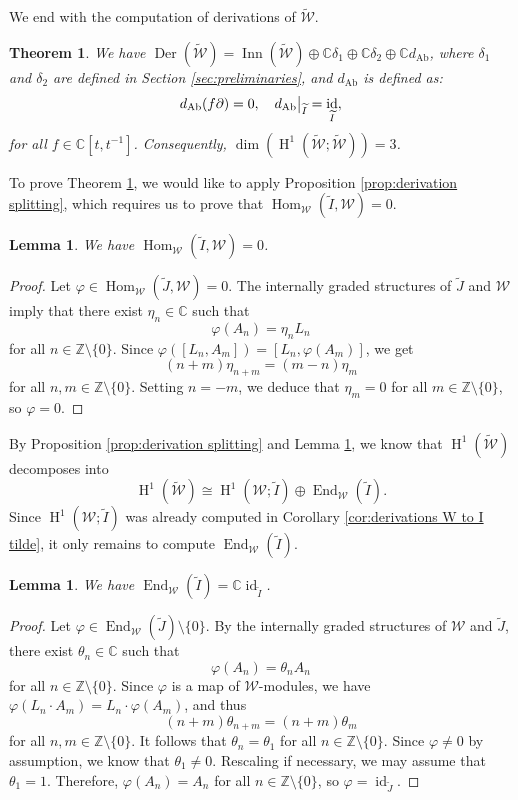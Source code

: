 \documentclass[11pt, svgnames]{amsart}
\DeclareMathOperator{\End}{End}
\DeclareMathOperator{\Hom}{Hom}
\newcommand{\ZZ}{\mathbb{Z}}
\newcommand{\CC}{\mathbb{C}}
\newcommand{\W}{\mathcal{W}}
\DeclareMathOperator{\id}{id}
\DeclareMathOperator{\Der}{Der}
\DeclareMathOperator{\Inn}{Inn}
\newcommand{\del}{\partial}
\DeclareMathOperator{\HH}{H}
\DeclareMathOperator{\Ab}{Ab}
\newcommand{\nonzero}{\setminus \{0\}}
\newcommand\restr[2]{{
  \left.\kern-\nulldelimiterspace %
  #1 %
  \vphantom{\big|}
  \right|_{#2}
  }}
\newtheorem{lemma}[proposition]{Lemma}
\newtheorem{theorem}[proposition]{Theorem}
\theoremstyle{definition}
\begin{document}
We end with the computation of derivations of $\widetilde{\W}$.

\begin{theorem}\label{thm:derivations W tilde}
    We have $\Der(\widetilde{\W}) = \Inn(\widetilde{\W}) \oplus \CC \delta_1 \oplus \CC \delta_2 \oplus \CC d_{\Ab}$, where $\delta_1$ and $\delta_2$ are defined in Section \ref{sec:preliminaries}, and $d_{\Ab}$ is defined as:
    $$d_{\Ab}(f\del) = 0, \quad \restr{d_{\Ab}}{\widetilde{I}} = \id_{\widetilde{I}},$$
    for all $f \in \CC[t,t^{-1}]$. Consequently, $\dim(\HH^1(\widetilde{\W};\widetilde{\W})) = 3$.
\end{theorem}

To prove Theorem \ref{thm:derivations W tilde}, we would like to apply Proposition \ref{prop:derivation splitting}, which requires us to prove that $\Hom_\W(\widetilde{I},\W) = 0$.

\begin{lemma}\label{lem:no homs I tilde to W}
    We have $\Hom_\W(\widetilde{I},\W) = 0$.
\end{lemma}
\begin{proof}
    Let $\varphi \in \Hom_\W(\widetilde{J},\W) = 0$. The internally graded structures of $\widetilde{J}$ and $\W$ imply that there exist $\eta_n \in \CC$ such that
    $$\varphi(A_n) = \eta_n L_n$$
    for all $n \in \ZZ \nonzero$. Since $\varphi([L_n,A_m]) = [L_n,\varphi(A_m)]$, we get
    $$(n + m)\eta_{n + m} = (m - n)\eta_m$$
    for all $n,m \in \ZZ \nonzero$. Setting $n = -m$, we deduce that $\eta_m = 0$ for all $m \in \ZZ \nonzero$, so $\varphi = 0$.
\end{proof}

By Proposition \ref{prop:derivation splitting} and Lemma \ref{lem:no homs I tilde to W}, we know that $\HH^1(\widetilde{\W})$ decomposes into
$$\HH^1(\widetilde{\W}) \cong \HH^1(\W;\widetilde{I}) \oplus \End_\W(\widetilde{I}).$$
Since $\HH^1(\W;\widetilde{I})$ was already computed in Corollary \ref{cor:derivations W to I tilde}, it only remains to compute $\End_\W(\widetilde{I})$.

\begin{lemma}\label{lem:endomorphisms I tilde}
    We have $\End_\W(\widetilde{I}) = \CC \id_{\widetilde{I}}$.
\end{lemma}
\begin{proof}
    Let $\varphi \in \End_\W(\widetilde{J}) \nonzero$. By the internally graded structures of $\W$ and $\widetilde{J}$, there exist $\theta_n \in \CC$ such that
    $$\varphi(A_n) = \theta_n A_n$$
    for all $n \in \ZZ \nonzero$. Since $\varphi$ is a map of $\W$-modules, we have $\varphi(L_n \cdot A_m) = L_n \cdot \varphi(A_m)$, and thus
    $$(n + m)\theta_{n + m} = (n + m)\theta_m$$
    for all $n,m \in \ZZ \nonzero$. It follows that $\theta_n = \theta_1$ for all $n \in \ZZ \nonzero$. Since $\varphi \neq 0$ by assumption, we know that $\theta_1 \neq 0$. Rescaling if necessary, we may assume that $\theta_1 = 1$. Therefore, $\varphi(A_n) = A_n$ for all $n \in \ZZ \nonzero$, so $\varphi = \id_{\widetilde{J}}$.
\end{proof}
\end{document}
